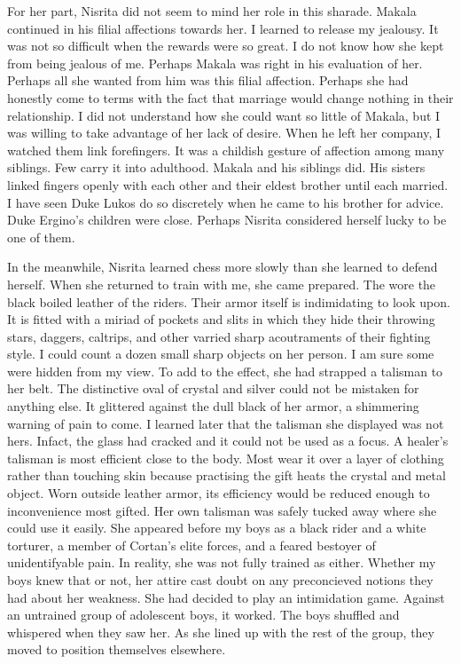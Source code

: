 \documentclass{article}
\begin{document}
For her part, Nisrita did not seem to mind her role in this sharade. Makala continued in his filial affections towards her. I learned to release my jealousy. It was not so difficult when the rewards were so great. I do not know how she kept from being jealous of me. Perhaps Makala was right in his evaluation of her. Perhaps all she wanted from him was this filial affection. Perhaps she had honestly come to terms with the fact that marriage would change nothing in their relationship. I did not understand how she could want so little of Makala, but I was willing to take advantage of her lack of desire. When he left her company, I watched them link forefingers. It was a childish gesture of affection among many siblings. Few carry it into adulthood. Makala and his siblings did. His sisters linked fingers openly with each other and their eldest brother until each married. I have seen Duke Lukos do so discretely when he came to his brother for advice. Duke Ergino's children were close. Perhaps Nisrita considered herself lucky to be one of them.

In the meanwhile, Nisrita learned chess more slowly than she learned to defend herself. When she returned to train with me, she came prepared. The wore the black boiled leather of the riders. Their armor itself is indimidating to look upon. It is fitted with a miriad of pockets and slits in which they hide their throwing stars, daggers, caltrips, and other varried sharp acoutraments of their fighting style. I could count a dozen small sharp objects on her person. I am sure some were hidden from my view. To add to the effect, she had strapped a talisman to her belt. The distinctive oval of crystal and silver could not be mistaken for anything else. It glittered against the dull black of her armor, a shimmering warning of pain to come. I learned later that the talisman she displayed was not hers. Infact, the glass had cracked and it could not be used as a focus. A healer's talisman is most efficient close to the body. Most wear it over a layer of clothing rather than touching skin because practising the gift heats the crystal and metal object. Worn outside leather armor, its efficiency would be reduced enough to inconvenience most gifted. Her own talisman was safely tucked away where she could use it easily. She appeared before my boys as a black rider and a white torturer, a member of Cortan's elite forces, and a feared bestoyer of unidentifyable pain. In reality, she was not fully trained as either. Whether my boys knew that or not, her attire cast doubt on any preconcieved notions they had about her weakness. She had decided to play an intimidation game. Against an untrained group of adolescent boys, it worked. The boys shuffled and whispered when they saw her. As she lined up with the rest of the group, they moved to position themselves elsewhere.
\end{document}
